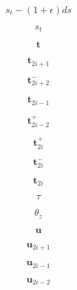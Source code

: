 \documentclass[a4paper,10pt,fleqn]{book}
\newcommand{\vect}[1]{\boldsymbol{#1}}
\begin{document}
\begin{equation}
s_t - (1+\epsilon)ds
\end{equation}


\begin{equation}
s_t
\end{equation}


\begin{equation}
\vect{t}
\end{equation}


\begin{equation}
\vect{t}_{2i+1}
\end{equation}


\begin{equation}
\vect{t}_{2i+2}^-
\end{equation}


\begin{equation}
\vect{t}_{2i-1}
\end{equation}


\begin{equation}
\vect{t}_{2i-2}^+
\end{equation}


\begin{equation}
\vect{t}_{2i}^+
\end{equation}


\begin{equation}
\vect{t}_{2i}^-
\end{equation}


\begin{equation}
\vect{t}_{2i}
\end{equation}


\begin{equation}
\tau
\end{equation}


\begin{equation}
\theta_z
\end{equation}


\begin{equation}
\vect{u}
\end{equation}


\begin{equation}
\vect{u}_{2i+1}
\end{equation}


\begin{equation}
\vect{u}_{2i-1}
\end{equation}


\begin{equation}
\vect{u}_{2i-2}
\end{equation}
\end{document}

